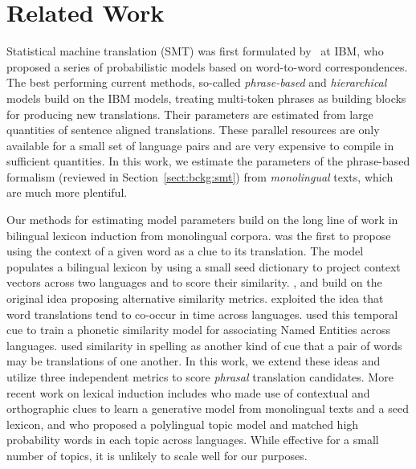 \documentclass[11pt]{article}
\newcommand{\mtodo}[1]{}
\newcommand{\secref}[1]{Section~\ref{#1}}
\begin{document}


\section{Related Work} \label{sect:related-work}

Statistical machine translation (SMT) was first formulated by~ at IBM, who proposed a series of probabilistic models based on word-to-word correspondences.  The best performing current methods, so-called {\em phrase-based} and {\em hierarchical} models \cite{Och:2002,Koehn:2003,Chiang:2005} build on the IBM models, treating multi-token phrases as building blocks for producing new translations.  Their parameters are estimated from large quantities of sentence aligned translations.
These parallel resources are only available for a small set of language pairs and are very expensive to compile in sufficient quantities.  
In this work, we estimate the parameters of the phrase-based formalism (reviewed in \secref{sect:bckg:smt}) from {\em monolingual} texts, which are much more plentiful. \nocite{Munteanu:2006,Smith2010,Uszkoreit:2010}

Our methods for estimating model parameters build on the long line of work in bilingual lexicon induction from monolingual corpora.  was the first to propose using the context of a given word as a clue to its translation.  The model populates a bilingual lexicon by using a small seed dictionary to project context vectors across two languages and to score their similarity. , and  build on the original idea proposing alternative similarity metrics.  exploited the idea that word translations tend to co-occur in time across languages.  used this temporal cue to train a phonetic similarity model for associating Named Entities across languages.   used similarity in spelling as another kind of cue that a pair of words may be translations of one another.  In this work, we extend these ideas and utilize three independent metrics to score {\em phrasal} translation candidates.  More recent work on lexical induction includes  who made use of contextual and orthographic clues to learn a generative model from monolingual texts and a seed lexicon, and  who proposed a polylingual topic model and matched high probability words in each topic across languages.  While effective for a small number of topics, it is unlikely to scale well for our purposes. %
\end{document}
